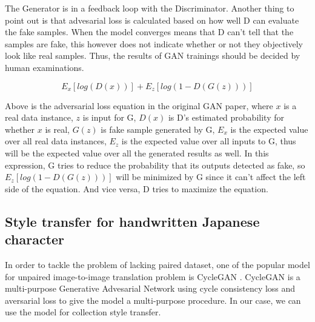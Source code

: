 \documentclass[12pt]{report}
\begin{document}
The Generator is in a feedback loop with the Discriminator. Another thing to point out is that advesarial loss is calculated based on how well D can evaluate the fake samples. When the model converges means that D can't tell that the samples are fake, this however does not indicate whether or not they objectively look like real samples. Thus, the results of GAN trainings should be decided by human examinations.

\[E_x[log(D(x))] + E_z[log(1 - D(G(z)))]\]

Above is the adversarial loss equation in the original GAN paper, where $x$ is a real data instance, $z$ is input for G, $D(x)$ is D's estimated probability for whether $x$ is real, $G(z)$ is fake sample generated by G, $E_x$ is the expected value over all real data instances, $E_z$ is the expected value over all inputs to G, thus will be the expected value over all the generated results as well. In this expression, G tries to reduce the probability that its outputs detected as fake, so $E_z[log(1-D(G(z)))]$ will be minimized by G since it can't affect the left side of the equation. And vice versa, D tries to maximize the equation.

\subsection{Style transfer for handwritten Japanese character}

In order to tackle the problem of lacking paired dataset, one of the popular model for unpaired image-to-image translation problem is CycleGAN \cite{cycle-gan}.
CycleGAN is a multi-purpose Generative Advesarial Network using cycle consistency loss and aversarial loss to give the model a multi-purpose procedure. In our case, we can use the model for collection style transfer.
\end{document}
